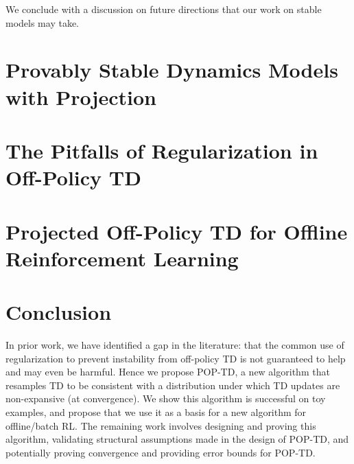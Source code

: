 \documentclass[11pt]{book}
\begin{document}
We conclude with a discussion on future directions that our work on stable models may take.


\mainmatter
\chapter{Provably Stable Dynamics Models with Projection}




\chapter{The Pitfalls of Regularization in Off-Policy TD}



\chapter{Projected Off-Policy TD for Offline Reinforcement Learning}


\chapter{Conclusion}

In prior work, we have identified a gap in the literature: that the common use of regularization to prevent instability from off-policy TD is not guaranteed to help and may even be harmful. Hence we propose POP-TD, a new algorithm that resamples TD to be consistent with a distribution under which TD updates are non-expansive (at convergence). We show this algorithm is successful on toy examples, and propose that we use it as a basis for a new algorithm for offline/batch RL.  The remaining work involves designing and proving this algorithm, validating structural assumptions made in the design of POP-TD, and potentially proving convergence and providing error bounds for POP-TD.

\appendix


\backmatter{}
\printbibliography{}
\end{document}
